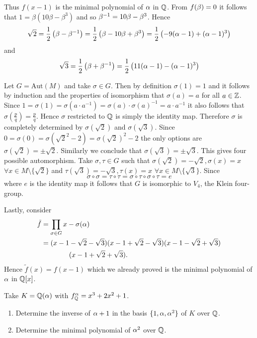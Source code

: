 \begin{sol}
        Thus $f(x-1)$ is the minimal polynomial of $\alpha$ in $\mathbb{Q}$. 
        From $f(\beta)=0$ it follows that $1=\beta(10\beta-\beta^3)$ and so $\beta^{-1}=10\beta-\beta^3$.
        Hence
        $$\sqrt{2}=\frac12\left(\beta-\beta^{-1}\right)=\frac12\left(\beta-10\beta+\beta^3\right)=\frac12\left(-9(\alpha-1)+(\alpha-1)^3\right)$$
        and
        $$\sqrt{3}=\frac12\left(\beta+\beta^{-1}\right)=\frac12\left(11(\alpha-1)-(\alpha-1)^3\right)$$

        Let $G=\text{Aut}(M)$ and take $\sigma\in G$. Then by definition $\sigma(1)=1$ and it follows by induction and the properties of isomorphism that $\sigma(a)=a$ for all $a\in\mathbb{Z}$.
        Since $1=\sigma(1)=\sigma(a\cdot a^{-1})=\sigma(a)\cdot\sigma(a)^{-1}=a\cdot a^{-1}$ it also follows that $\sigma\left(\frac{p}{q}\right)=\frac{p}{q}$. 
        Hence $\sigma$ restricted to $\mathbb{Q}$ is simply the identity map. 
        Therefore $\sigma$ is completely determined by $\sigma(\sqrt{2})$ and $\sigma(\sqrt{3})$.
        Since $0=\sigma(0)=\sigma(\sqrt{2}^2-2)=\sigma(\sqrt{2})^2-2$ the only options are $\sigma(\sqrt{2})=\pm\sqrt{2}$.
        Similarly we conclude that $\sigma(\sqrt{3})=\pm\sqrt{3}$. This gives four possible automorphism.
        Take $\sigma,\tau\in G$ such that $\sigma(\sqrt{2})=-\sqrt{2}, \sigma(x)=x$ $\forall x\in M\setminus\{\sqrt{2}\}$ and $\tau(\sqrt{3})=-\sqrt{3},\tau(x)=x$ $\forall x\in M\setminus\{\sqrt{3}\}$. 
        Since 
        $$\sigma\circ\sigma=\tau\circ\tau=\sigma\circ\tau\circ\sigma\circ\tau=e$$
        where $e$ is the identity map it follows that $G$ is isomorphic to $V_4$, the Klein four-group.

        Lastly, consider
        \begin{align*}
            \tilde{f}&=\prod_{\sigma\in G}x-\sigma(\alpha)\\
            &=(x-1-\sqrt{2}-\sqrt{3})(x-1+\sqrt{2}-\sqrt{3})(x-1-\sqrt{2}+\sqrt{3})\\&\qquad\qquad (x-1+\sqrt{2}+\sqrt{3}).
        \end{align*}
        Hence $\tilde{f}(x)=f(x-1)$ which we already proved is the minimal polynomial of $\alpha$ in $\mathbb{Q}[x]$.

    \end{sol}

    \begin{ex}{21.29}
        Take $K=\mathbb{Q}(\alpha)$ with $f^\alpha_{\mathbb{Q}}=x^3+2x^2+1$.
        \begin{enumerate}
            \item Determine the inverse of $\alpha+1$ in the basis $\{1,\alpha,\alpha^2\}$ of $K$ over $\mathbb{Q}$.
            \item Determine the minimal polynomial of $\alpha^2$ over $\mathbb{Q}$.
        \end{enumerate}
    \end{ex}

